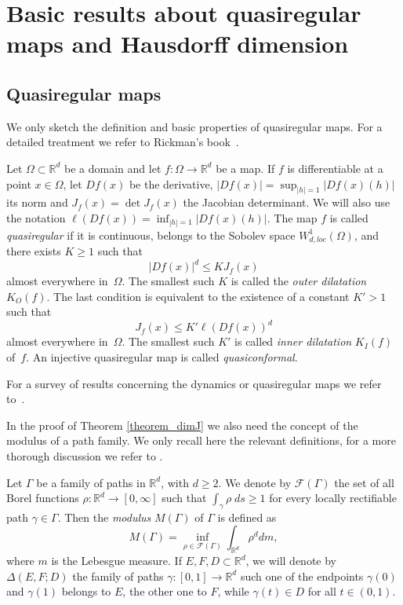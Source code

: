 \documentclass[12pt,a4paper]{amsart}
\theoremstyle{plain}
\theoremstyle{definition}
\theoremstyle{remark}
\def\R{\mathbb R}
\def\det{\operatorname{det}}
\numberwithin{equation}{section}
\begin{document}
\section{Basic results about quasiregular maps and Hausdorff dimension} \label{prelim}
\subsection{Quasiregular maps}  \label{qr_maps} 
We only sketch the definition and basic properties of quasiregular maps.
For a detailed treatment we refer to Rickman's book~\cite{Rickman1993}.

Let $\Omega\subset\R^d$ be a domain and let $f\colon \Omega \to \R^{d}$ be a map.
If $f$ is differentiable at a point $x\in\Omega$, let $Df(x)$ be the derivative,
$|Df(x)|=\sup_{|h|=1}|Df(x)(h)|$ its norm and $J_f(x)=\det J_f(x)$ the
 Jacobian determinant.
We will also use the notation $\ell(Df(x))=\inf_{|h|=1}|Df(x)(h)|$.
The map  $f$ is called \emph{quasiregular} if it is continuous, belongs to the Sobolev
space $W^{1}_{d, loc}(\Omega)$, and there exists $K\geq 1$ such that 
\begin{equation} \label{0e}
|Df(x)|^{d} \leq K J_{f}(x)
\end{equation}
almost everywhere in~$\Omega$. The smallest such $K$ is called the \emph{outer dilatation} $K_O(f)$.
The last condition is equivalent to the existence of a constant $K'>1$
such that 
\begin{equation}\label{0f}
J_f(x)\leq K'\ell(Df(x))^d
\end{equation}
almost everywhere in~$\Omega$. The smallest such $K'$ is called \emph{inner dilatation} $K_I(f)$ of~$f$.
An injective quasiregular map is called \emph{quasiconformal}.

For a survey of results concerning the dynamics or quasiregular maps
we refer to~\cite{Bergweiler2010a}.

In the proof of Theorem \ref{theorem_dimJ} we also need the concept of the modulus of a path family.
We only recall here the relevant definitions, for a more thorough discussion we refer to \cite{Rickman1993}.

Let $\Gamma$ be a family of paths in $\mathbb{R}^d$, with $d\geq 2$.
We denote by $\mathcal{F}(\Gamma)$ the set of all Borel functions $\rho\colon\mathbb{R}^d\to [0,\infty]$
such that $\int_\gamma\rho\; ds\geq 1$ for every locally rectifiable path $\gamma\in \Gamma$. 
Then the \emph{modulus} $M(\Gamma)$ of $\Gamma$ is defined as
\begin{equation}
	M(\Gamma)=\inf_{\rho\in \mathcal{F}(\Gamma)}\int_{\mathbb{R}^d}\rho^d dm,
\end{equation}
where $m$ is the Lebesgue measure. If $E,F,D\subset \mathbb{R}^d$, we will denote
by $\Delta\!\left(E,F;D\right)$ the family of paths
$\gamma\colon [0,1]\to \mathbb{R}^d$ such one of the endpoints $\gamma(0)$ and $\gamma(1)$
belongs to $E$, the other one to $F$, while  $\gamma(t)\in D$ for all $t\in(0,1)$.
\end{document}
